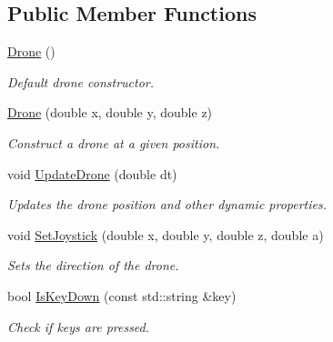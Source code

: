 \subsection*{Public Member Functions}
\begin{DoxyCompactItemize}
\item 
\mbox{\label{classDrone_ab692baa4be5c43b72990ce1b01bdc805}} 
\hyperlink{classDrone_ab692baa4be5c43b72990ce1b01bdc805}{Drone} ()
\begin{DoxyCompactList}\small\item\em Default drone constructor. \end{DoxyCompactList}\item 
\mbox{\label{classDrone_a7875422c0bf36072ab6d747b6d543b67}} 
\hyperlink{classDrone_a7875422c0bf36072ab6d747b6d543b67}{Drone} (double x, double y, double z)
\begin{DoxyCompactList}\small\item\em Construct a drone at a given position. \end{DoxyCompactList}\item 
\mbox{\label{classDrone_ad8b728197d7de13358f17e192a9c7e1d}} 
void \hyperlink{classDrone_ad8b728197d7de13358f17e192a9c7e1d}{Update\+Drone} (double dt)
\begin{DoxyCompactList}\small\item\em Updates the drone position and other dynamic properties. \end{DoxyCompactList}\item 
\mbox{\label{classDrone_a49ba636e2a579845fbc85eda05ea3735}} 
void \hyperlink{classDrone_a49ba636e2a579845fbc85eda05ea3735}{Set\+Joystick} (double x, double y, double z, double a)
\begin{DoxyCompactList}\small\item\em Sets the direction of the drone. \end{DoxyCompactList}\item 
bool \hyperlink{classDrone_a9b164e1535a80ce8e4de11ab0c0edcdc}{Is\+Key\+Down} (const std\+::string \&key)
\begin{DoxyCompactList}\small\item\em Check if keys are pressed. \end{DoxyCompactList}\item 
\mbox{\label{classDrone_a95aca396f093db8ec2a8e533e6a8bd60}} 

\end{DoxyCompactItemize}
